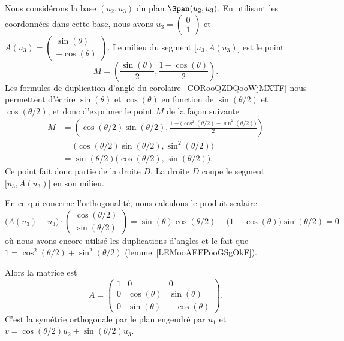 \begin{subproof}
	Nous considérons la base \( (u_2, u_3)\) du plan \( \Span(u_2,u_3)\). En utilisant les coordonnées dans cette base, nous avons \( u_3=\begin{pmatrix}
		0 \\
		1
	\end{pmatrix}\) et \( A(u_3)=\begin{pmatrix}
		\sin(\theta) \\
		-\cos(\theta)
	\end{pmatrix}\). Le milieu du segment \( \mathopen[ u_3 , A(u_3) \mathclose]\) est le point
	\begin{equation}
		M=\left( \frac{ \sin(\theta) }{2},\frac{ 1-\cos(\theta) }{2} \right).
	\end{equation}
	Les formules de duplication d'angle du corolaire~\ref{CORooQZDQooWjMXTF} nous permettent d'écrire \( \sin(\theta)\) et \( \cos(\theta)\) en fonction de \( \sin(\theta/2)\) et \( \cos(\theta/2)\), et donc d'exprimer le point \( M\) de la façon suivante :
	\begin{subequations}
		\begin{align}
			M & =\left( \cos(\theta/2)\sin(\theta/2),\frac{ 1-\big( \cos^2(\theta/2)-\sin^2(\theta/2) \big) }{2} \right) \\
			  & =\big( \cos(\theta/2)\sin(\theta/2),\sin^2(\theta/2) \big)                                               \\
			  & =\sin(\theta/2)\big( \cos(\theta/2),\sin(\theta/2) \big).
		\end{align}
	\end{subequations}
	Ce point fait donc partie de la droite \( D\). La droite \( D\) coupe le segment \( \mathopen[ u_3 , A(u_3) \mathclose]\) en son milieu.

	En ce qui concerne l'orthogonalité, nous calculons le produit scalaire
	\begin{equation}
		\big( A(u_3)-u_3 \big)\cdot\begin{pmatrix}
			\cos(\theta/2) \\
			\sin(\theta/2)
		\end{pmatrix}
		=\sin(\theta)\cos(\theta/2)-\big( 1+\cos(\theta) \big)\sin(\theta/2)=0
	\end{equation}
	où nous avons encore utilisé les duplications d'angles et le fait que \( 1=\cos^2(\theta/2)+\sin^2(\theta/2)\) (lemme~\ref{LEMooAEFPooGSgOkF}).

	\spitem[Si \( \epsilon=-1\) et \( \lambda=1\)] Alors la matrice est
	\begin{equation}
		A=\begin{pmatrix}
			1 & 0            & 0             \\
			0 & \cos(\theta) & \sin(\theta)  \\
			0 & \sin(\theta) & -\cos(\theta)
		\end{pmatrix}.
	\end{equation}
	C'est la symétrie orthogonale par le plan engendré par \( u_1\) et \( v=\cos(\theta/2)u_2+\sin(\theta/2)u_3\).


\end{subproof}
